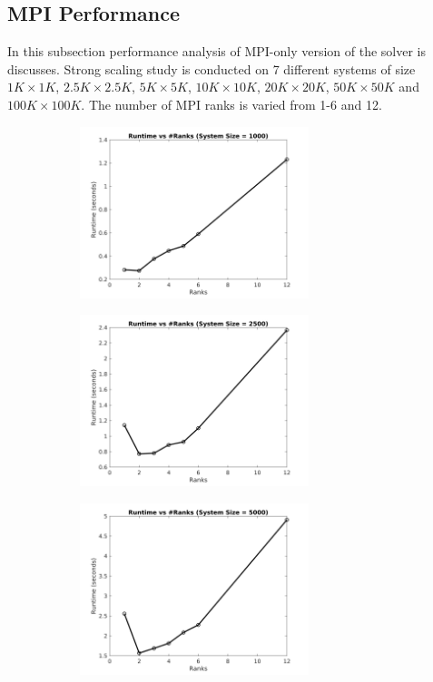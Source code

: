 \documentclass[sigplan,screen]{acmart}
\begin{document}
\subsection{MPI Performance}\label{mpi_perfrom}
In this subsection performance analysis of MPI-only version of the solver is discusses. Strong scaling study is conducted on 7 different systems of size $1K\times 1K$, $2.5K\times 2.5K$, $5K\times 5K$, $10K\times 10K$, $20K\times 20K$, $50K\times 50K$ and $100K\times 100K$. The number of MPI ranks is varied from 1-6 and 12. 
\begin{figure}
	\begin{subfigure}{0.4\textwidth}
		\includegraphics[trim= 20 5 35 10,clip, width=0.95\linewidth, height=5cm]{MPI_strong_1k.png} 
		\caption{}
	\end{subfigure}
	\begin{subfigure}{0.4\textwidth}
		\includegraphics[trim= 20 5 35 10,clip, width=0.95\linewidth, height=5cm]{MPI_strong_2k.png}
		\caption{}
	\end{subfigure}
	\begin{subfigure}{0.4\textwidth}
		\includegraphics[trim= 20 5 35 10,clip, width=0.95\linewidth, height=5cm]{MPI_strong_5k.png}

\end{subfigure}
\end{figure}
\end{document}
